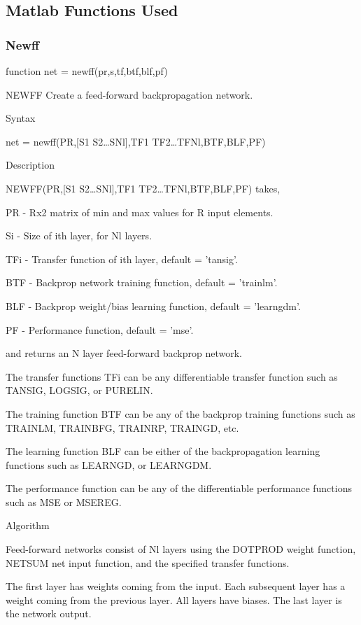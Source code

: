 \subsection{Matlab Functions Used}
\subsubsection{Newff}
function net = newff(pr,s,tf,btf,blf,pf)

NEWFF Create a feed-forward backpropagation network.

   Syntax

     net = newff(PR,[S1 S2\ldots SNl],{TF1 TF2\ldots TFNl},BTF,BLF,PF)

   Description

     NEWFF(PR,[S1 S2\ldots SNl],{TF1 TF2\ldots TFNl},BTF,BLF,PF) takes,

       PR  - Rx2 matrix of min and max values for R input elements.

       Si  - Size of ith layer, for Nl layers.

       TFi - Transfer function of ith layer, default = 'tansig'.

       BTF - Backprop network training function, default = 'trainlm'.

       BLF - Backprop weight/bias learning function, default = 'learngdm'.

       PF  - Performance function, default = 'mse'.

     and returns an N layer feed-forward backprop network.

     The transfer functions TFi can be any differentiable transfer
     function such as TANSIG, LOGSIG, or PURELIN.

     The training function BTF can be any of the backprop training
     functions such as TRAINLM, TRAINBFG, TRAINRP, TRAINGD, etc.

     The learning function BLF can be either of the backpropagation
     learning functions such as LEARNGD, or LEARNGDM.

     The performance function can be any of the differentiable performance
     functions such as MSE or MSEREG.

   Algorithm

     Feed-forward networks consist of Nl layers using the DOTPROD
     weight function, NETSUM net input function, and the specified
     transfer functions.

     The first layer has weights coming from the input.  Each subsequent
     layer has a weight coming from the previous layer.  All layers
     have biases.  The last layer is the network output.

